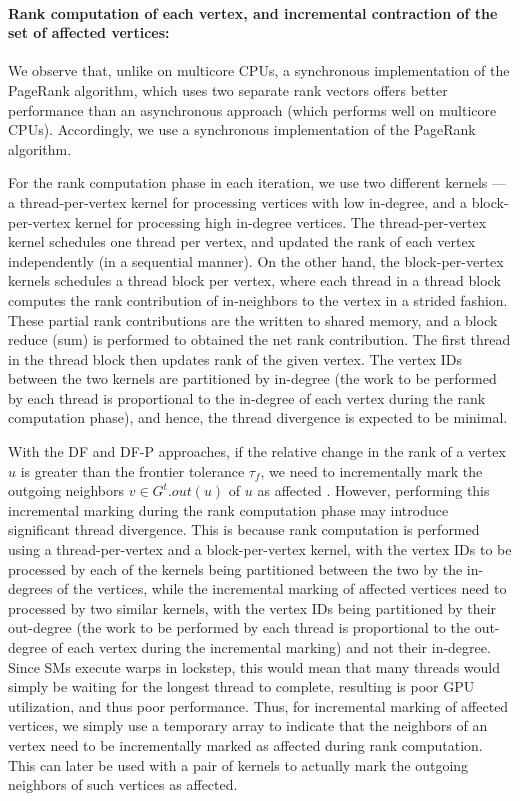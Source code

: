 \paragraph{Rank computation of each vertex, and incremental contraction of the set of affected vertices:}

We observe that, unlike on multicore CPUs, a synchronous implementation of the PageRank algorithm, which uses two separate rank vectors offers better performance than an asynchronous approach (which performs well on multicore CPUs). Accordingly, we use a synchronous implementation of the PageRank algorithm.

For the rank computation phase in each iteration, we use two different kernels --- a thread-per-vertex kernel for processing vertices with low in-degree, and a block-per-vertex kernel for processing high in-degree vertices. The thread-per-vertex kernel schedules one thread per vertex, and updated the rank of each vertex independently (in a sequential manner). On the other hand, the block-per-vertex kernels schedules a thread block per vertex, where each thread in a thread block computes the rank contribution of in-neighbors to the vertex in a strided fashion. These partial rank contributions are the written to shared memory, and a block reduce (sum) is performed to obtained the net rank contribution. The first thread in the thread block then updates rank of the given vertex. The vertex IDs between the two kernels are partitioned by in-degree (the work to be performed by each thread is proportional to the in-degree of each vertex during the rank computation phase), and hence, the thread divergence is expected to be minimal.

With the DF and DF-P approaches, if the relative change in the rank of a vertex $u$ is greater than the frontier tolerance $\tau_f$, we need to incrementally mark the outgoing neighbors $v \in G^t.out(u)$ of $u$ as affected \cite{sahu2024df}. However, performing this incremental marking during the rank computation phase may introduce significant thread divergence. This is because rank computation is performed using a thread-per-vertex and a block-per-vertex kernel, with the vertex IDs to be processed by each of the kernels being partitioned between the two by the in-degrees of the vertices, while the incremental marking of affected vertices need to processed by two similar kernels, with the vertex IDs being partitioned by their out-degree (the work to be performed by each thread is proportional to the out-degree of each vertex during the incremental marking) and not their in-degree. Since SMs execute warps in lockstep, this would mean that many threads would simply be waiting for the longest thread to complete, resulting is poor GPU utilization, and thus poor performance. Thus, for incremental marking of affected vertices, we simply use a temporary array to indicate that the neighbors of an vertex need to be incrementally marked as affected during rank computation. This can later be used with a pair of kernels to actually mark the outgoing neighbors of such vertices as affected.

